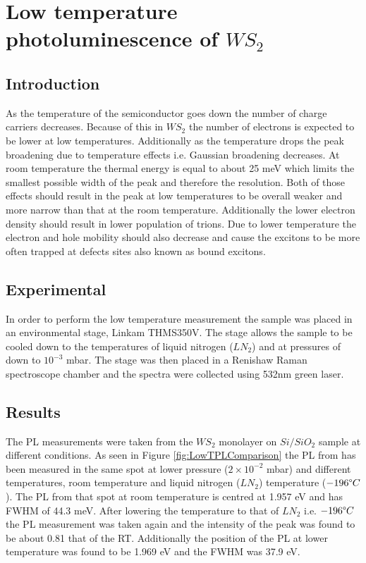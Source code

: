 \chapter{Low temperature photoluminescence of $WS_2$}

\section{Introduction}

As the temperature of the semiconductor goes down the number of charge carriers decreases. Because of this in $WS_2$ the number of electrons is expected to be lower at low temperatures. Additionally as the temperature drops the peak broadening due to temperature effects i.e. Gaussian broadening decreases. At room temperature the thermal energy is equal to about 25 meV which limits the smallest possible width of the peak and therefore the resolution. Both of those effects should result in the peak at low temperatures to be overall weaker and more narrow than that at the room temperature. Additionally the lower electron density should result in lower population of trions. Due to lower temperature the electron and hole mobility should also decrease and cause the excitons to be more often trapped at defects sites also known as bound excitons.

\section{Experimental}

In order to perform the low temperature measurement the sample was placed in an environmental stage, Linkam THMS350V. The stage allows the sample to be cooled down to the temperatures of liquid nitrogen ($LN_2$) and at pressures of down to $10^{-3}$ mbar. The stage was then placed in a Renishaw Raman spectroscope chamber and the spectra were collected using 532nm green laser.

\section{Results}

The PL measurements were taken from the $WS_2$ monolayer on $Si/SiO_2$ sample at different conditions. As seen in Figure \ref{fig:LowTPLComparison} the PL from has been measured in the same spot at lower pressure ($2 \times 10^{-2}$ mbar) and different temperatures, room temperature and liquid nitrogen ($LN_2$) temperature ($-196 \degree C$). The PL from that spot at room temperature is centred at 1.957 eV and has FWHM of 44.3 meV. After lowering the temperature to that of $LN_2$ i.e. $-196 \degree C$ the PL measurement was taken again and the intensity of the peak was found to be about 0.81 that of the RT. Additionally the position of the PL at lower temperature was found to be 1.969 eV and the FWHM was 37.9 eV.

